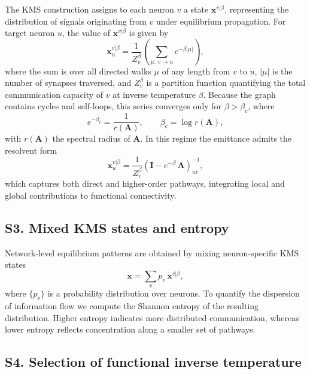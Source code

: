 The KMS construction assigns to each neuron $v$ a state $\mathbf{x}^{v|\beta}$,
representing the distribution of signals originating from $v$ under equilibrium
propagation. For target neuron $u$, the value of $\mathbf{x}^{v|\beta}$ is given by
\begin{equation}
\mathbf{x}^{v|\beta}_{u}
=
\frac{1}{Z^{\beta}_{v}}
\left(
\sum_{\mu:\,v\to u} e^{-\beta |\mu|}
\right),
\label{eq:SI_emittance}
\end{equation}
where the sum is over all directed walks $\mu$ of any length from $v$ to $u$, $|\mu|$ is
the number of synapses traversed, and $Z^{\beta}_{v}$ is a partition function quantifying
the total communication capacity of $v$ at inverse temperature $\beta$. Because the graph
contains cycles and self-loops, this series converges only for $\beta > \beta_c$, where
\begin{equation}
e^{-\beta_{c}} = \frac{1}{r(\mathbf{A})}, \qquad \beta_{c} = \log r(\mathbf{A}),
\end{equation}
with $r(\mathbf{A})$ the spectral radius of $\mathbf{A}$. In this regime the emittance
admits the resolvent form
\begin{equation}
\mathbf{x}^{v|\beta}_{u} = \frac{1}{Z^{\beta}_{v}}
\left( \mathbf{I} - e^{-\beta}\,\mathbf{A} \right)^{-1}_{uv},
\end{equation}
which captures both direct and higher-order pathways, integrating local and global
contributions to functional connectivity.

\subsection*{S3.\; Mixed KMS states and entropy}

Network-level equilibrium patterns are obtained by mixing neuron-specific KMS states
\begin{equation}
\mathbf{x} = \sum_{v} p_v \, \mathbf{x}^{v|\beta},
\end{equation}
where $\{p_v\}$ is a probability distribution over neurons. To quantify the dispersion of
information flow we compute the Shannon entropy of the resulting distribution. Higher
entropy indicates more distributed communication, whereas lower entropy reflects
concentration along a smaller set of pathways.

\subsection*{S4.\; Selection of functional inverse temperature}

